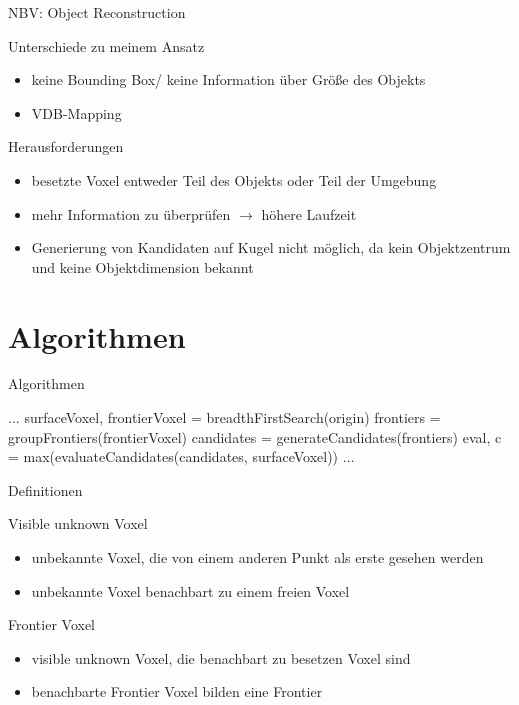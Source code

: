 \documentclass{beamer}
\begin{document}
\begin{frame}{NBV: Object Reconstruction}
	\begin{block}{Unterschiede zu meinem Ansatz}
		\begin{itemize}
			\item keine Bounding Box/ keine Information über Größe des Objekts
			\item VDB-Mapping
		\end{itemize}
	\end{block}
	\begin{exampleblock}{Herausforderungen}
		\begin{itemize}
			\item besetzte Voxel entweder Teil des Objekts oder Teil der Umgebung
			\item mehr Information zu überprüfen $\to$ höhere Laufzeit
			\item Generierung von Kandidaten auf Kugel nicht möglich, da kein Objektzentrum und keine Objektdimension bekannt
		\end{itemize}
	\end{exampleblock}

\end{frame}

\section{Algorithmen}
\begin{frame}{Algorithmen}
	\begin{algorithm}[H]
		\caption{NBV}
		\begin{algorithmic}[1]
			\State $\dots$
			\State surfaceVoxel, frontierVoxel =  breadthFirstSearch(origin)
			\State frontiers = groupFrontiers(frontierVoxel)
			\State candidates = generateCandidates(frontiers)
			\State eval, c = max(evaluateCandidates(candidates, surfaceVoxel))
			\State $\dots$
			\EndWhile
		\end{algorithmic}
	\end{algorithm}
\end{frame}
\begin{frame}{Definitionen}
	\begin{exampleblock}{Visible unknown Voxel}
		\begin{itemize}
			\item unbekannte Voxel, die von einem anderen Punkt als erste gesehen werden
			\item unbekannte Voxel benachbart zu einem freien Voxel
		\end{itemize}
		\cite{vasquez-gomez_vpl_2020}
	\end{exampleblock}
	\begin{exampleblock}{Frontier Voxel}
		\begin{itemize}
			\item visible unknown Voxel, die benachbart zu besetzen Voxel sind
			\item benachbarte Frontier Voxel bilden eine Frontier

		\end{itemize}
		\cite{vasquez-gomez_vpl_2020}
	\end{exampleblock}
\end{frame}
\end{document}
